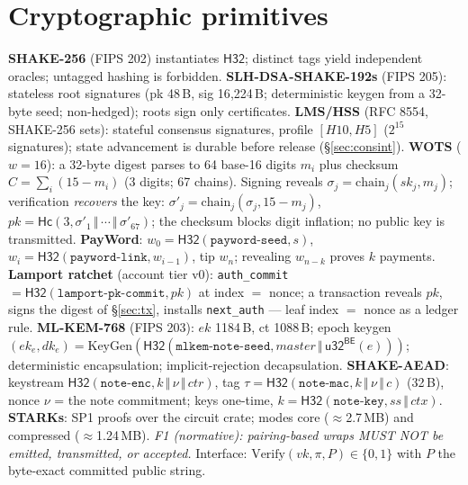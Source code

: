 \documentclass[10pt]{article}
\newcommand{\ct}[1]{\texttt{#1}}
\newcommand{\Hs}{\mathsf{H32}}
\newcommand{\Hc}{\mathsf{Hc}}
\newcommand{\cat}{\,\Vert\,}
\begin{document}
\section{Cryptographic primitives}
\textbf{SHAKE-256} (FIPS 202) instantiates $\Hs$; distinct tags yield independent oracles; untagged hashing is forbidden. \textbf{SLH-DSA-SHAKE-192s} (FIPS 205): stateless root signatures (pk 48\,B, sig 16{,}224\,B; deterministic keygen from a 32-byte seed; non-hedged); roots sign only certificates. \textbf{LMS/HSS} (RFC 8554, SHAKE-256 sets): stateful consensus signatures, profile $[H10,H5]$ ($2^{15}$ signatures); state advancement is durable before release (\S\ref{sec:consint}). \textbf{WOTS} ($w{=}16$): a 32-byte digest parses to 64 base-16 digits $m_i$ plus checksum $C=\sum_i(15-m_i)$ (3 digits; 67 chains). Signing reveals $\sigma_j = \mathrm{chain}_j(\mathit{sk}_j, m_j)$; verification \emph{recovers} the key: $\sigma'_j = \mathrm{chain}_j(\sigma_j, 15-m_j)$, $\mathit{pk} = \Hc(3, \sigma'_1\cat\cdots\cat\sigma'_{67})$; the checksum blocks digit inflation; no public key is transmitted. \textbf{PayWord}: $w_0 = \Hs(\ct{payword-seed}, s)$, $w_i = \Hs(\ct{payword-link}, w_{i-1})$, tip $w_n$; revealing $w_{n-k}$ proves $k$ payments. \textbf{Lamport ratchet} (account tier v0): \ct{auth\_commit} $= \Hs(\ct{lamport-pk-commit}, \mathit{pk})$ at index $=$ nonce; a transaction reveals $\mathit{pk}$, signs the digest of \S\ref{sec:tx}, installs \ct{next\_auth} --- leaf index $=$ nonce as a ledger rule. \textbf{ML-KEM-768} (FIPS 203): $\mathit{ek}$ 1184\,B, ct 1088\,B; epoch keygen $(\mathit{ek}_e,\mathit{dk}_e) = \mathrm{KeyGen}(\Hs(\ct{mlkem-note-seed}, \mathit{master}\cat \mathsf{u32^{BE}}(e)))$; deterministic encapsulation; implicit-rejection decapsulation. \textbf{SHAKE-AEAD}: keystream $\Hs(\ct{note-enc}, k\cat\nu\cat \mathit{ctr})$, tag $\tau = \Hs(\ct{note-mac}, k\cat\nu\cat c)$ (32\,B), nonce $\nu$ = the note commitment; keys one-time, $k = \Hs(\ct{note-key}, \mathit{ss}\cat \mathit{ctx})$. \textbf{STARKs}: SP1 proofs over the circuit crate; modes core ($\approx$2.7\,MB) and compressed ($\approx$1.24\,MB). \emph{F1 (normative): pairing-based wraps MUST NOT be emitted, transmitted, or accepted.} Interface: $\mathrm{Verify}(\mathit{vk}, \pi, P) \in \{0,1\}$ with $P$ the byte-exact committed public string.
\end{document}
